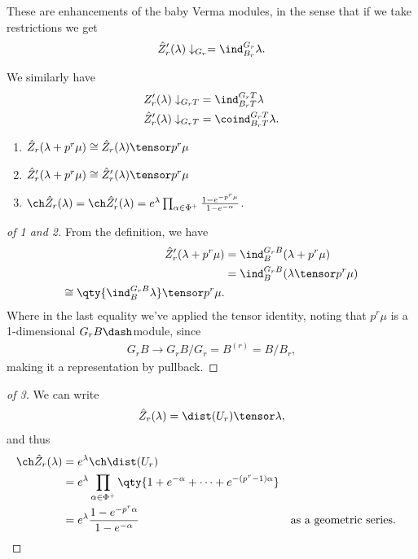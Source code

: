 These are enhancements of the baby Verma modules, in the sense that if
we take restrictions we get
\begin{align*}  
\hat{Z}_r' (\lambda) \downarrow_{G_r} = \ind_{B_r}^{G_r} \lambda
.\end{align*}

We similarly have
\begin{align*}  
{Z}_r' (\lambda) \downarrow_{G_r T} &= \ind_{B_r T}^{G_r T} \lambda \\
\hat{Z}_r' (\lambda) \downarrow_{G_r T} &= \coind_{B_r T}^{G_r T} \lambda
.\end{align*}

\begin{proposition}[?]

\envlist

\begin{enumerate}
\def\labelenumi{\arabic{enumi}.}
\tightlist
\item
  \(\hat{Z}_r(\lambda + p^r \mu) \cong \hat{Z}_r(\lambda) \tensor p^r \mu\)
\item
  \(\hat{Z}_r' (\lambda + p^r \mu) \cong \hat{Z}_r' (\lambda) \tensor p^r \mu\)
\item
  \(\ch \hat{Z}_r(\lambda) = \ch \hat{Z}_r' (\lambda) = e^\lambda \prod_{\alpha\in\Phi^+} {1 - e^{-p^r\mu} \over 1 - e^{-\alpha}}\).
\end{enumerate}

\end{proposition}

\begin{proof}[of 1 and 2]

From the definition, we have
\begin{align*}  
\hat{Z}_r'(\lambda + p^r \mu)
&= \ind_{B}^{G_r B} (\lambda + p^r \mu) \\
&= \ind_{B}^{G_r B} (\lambda \tensor  p^r \mu) \\
\cong \qty{\ind_B^{G_r B} \lambda} \tensor p^r\mu
.\end{align*} Where in the last equality we've applied the tensor
identity, noting that \(p^r\mu\) is a 1-dimensional
\(G_r B\dash\)module, since
\begin{align*}  
G_r B \to G_r B/G_r = B^{(r)} = B/B_r
,\end{align*} making it a representation by pullback.

\end{proof}

\begin{proof}[of 3]

We can write
\begin{align*}  
\hat{Z}_r(\lambda) = \dist(U_r) \tensor \lambda
,\end{align*} and thus
\begin{align*}  
\ch \hat{Z}_r(\lambda) 
&= e^{\lambda} \ch \dist(U_r)  \\
&= e^{\lambda} \prod_{\alpha\in \Phi^+}\qty{ 1 + e^{-\alpha} + \cdots + e^{-(p^r-1)\alpha} } \\
&= e^\lambda {1 - e^{-p^r \alpha} \over 1 - e^{-\alpha}} && \text{as a geometric series}
.\end{align*}

\end{proof}

